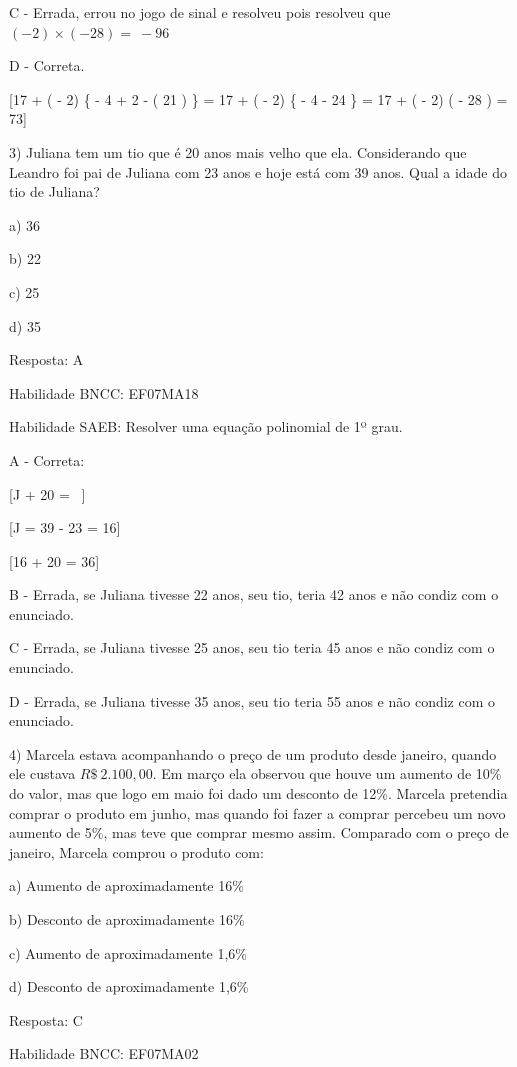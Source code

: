 C - Errada, errou no jogo de sinal e resolveu pois resolveu que
\(( - 2) \times \left( - 28 \right) = \  - 96\)

D - Correta.

[17 + ( - 2) \times \left\{ - 4 + 2 \times \left{} - \left( 21 \right) \right\rbrack \right\} = 17 + ( - 2) \times \left\{ - 4 - 24 \right\} = 17 + ( - 2) \times \left( - 28 \right) = 73]

3) Juliana tem um tio que é 20 anos mais velho que ela. Considerando que
Leandro foi pai de Juliana com 23 anos e hoje está com 39 anos. Qual a
idade do tio de Juliana?

a) 36

b) 22

c) 25

d) 35

Resposta: A

Habilidade BNCC: EF07MA18

Habilidade SAEB: Resolver uma equação polinomial de 1º grau.

A - Correta:

[\text{\ \ \ \ \ \ \ }J + 20 = \ ]

[J = 39 - 23 = 16]

[16 + 20 = 36]

B - Errada, se Juliana tivesse 22 anos, seu tio, teria 42 anos e não
condiz com o enunciado.

C - Errada, se Juliana tivesse 25 anos, seu tio teria 45 anos e não
condiz com o enunciado.

D - Errada, se Juliana tivesse 35 anos, seu tio teria 55 anos e não
condiz com o enunciado.

4) Marcela estava acompanhando o preço de um produto desde janeiro,
quando ele custava \(R\$\ 2.100,00\). Em março ela observou que houve um
aumento de 10\% do valor, mas que logo em maio foi dado um desconto de
12\%. Marcela pretendia comprar o produto em junho, mas quando foi fazer
a comprar percebeu um novo aumento de 5\%, mas teve que comprar mesmo
assim. Comparado com o preço de janeiro, Marcela comprou o produto com:

a) Aumento de aproximadamente 16\%

b) Desconto de aproximadamente 16\%

c) Aumento de aproximadamente 1,6\%

d) Desconto de aproximadamente 1,6\%

Resposta: C

Habilidade BNCC: EF07MA02


